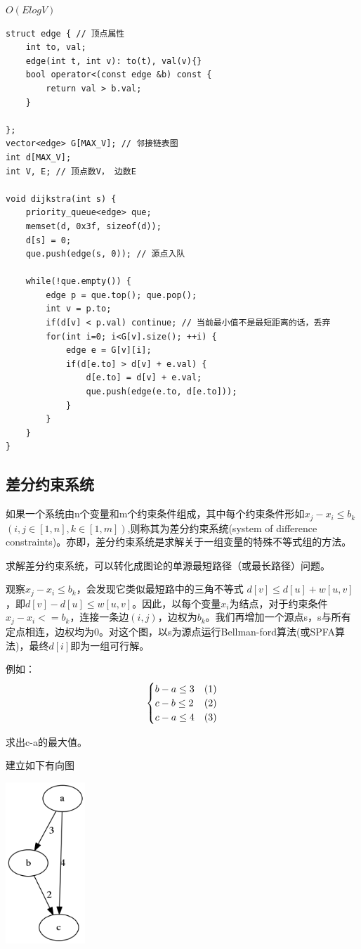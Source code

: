 \documentclass[a4paper]{ctexrep}
\begin{document}
$O(E logV)$
\begin{lstlisting}
struct edge { // 顶点属性
	int to, val;
	edge(int t, int v): to(t), val(v){}
	bool operator<(const edge &b) const {
		return val > b.val;
	}

};
vector<edge> G[MAX_V]; // 邻接链表图
int d[MAX_V];
int V, E; // 顶点数V， 边数E

void dijkstra(int s) {
	priority_queue<edge> que;
	memset(d, 0x3f, sizeof(d));
	d[s] = 0;
	que.push(edge(s, 0)); // 源点入队

	while(!que.empty()) {
		edge p = que.top(); que.pop();
		int v = p.to;
		if(d[v] < p.val) continue; // 当前最小值不是最短距离的话，丢弃
		for(int i=0; i<G[v].size(); ++i) {
			edge e = G[v][i];
			if(d[e.to] > d[v] + e.val) {
				d[e.to] = d[v] + e.val;
				que.push(edge(e.to, d[e.to]));
			}
		}
	}
}
\end{lstlisting}



\subsection{差分约束系统}
如果一个系统由n个变量和m个约束条件组成，其中每个约束条件形如$x_j-x_i \le b_k$ $(i,j \in [1,n],k \in [1,m])$,则称其为差分约束系统(system of difference constraints)。亦即，差分约束系统是求解关于一组变量的特殊不等式组的方法。

求解差分约束系统，可以转化成图论的单源最短路径（或最长路径）问题。

观察$x_j-x_i \le b_k$，会发现它类似最短路中的三角不等式 $d[v] \le d[u]+w[u,v]$，即$d[v]-d[u] \le w[u,v]$。因此，以每个变量$x_i$为结点，对于约束条件$x_j-x_i<=b_k$，连接一条边$(i,j)$，边权为$b_k$。我们再增加一个源点s，s与所有定点相连，边权均为0。对这个图，以s为源点运行Bellman-ford算法(或SPFA算法)，最终${d[i]}$即为一组可行解。

例如：
$$
\begin{cases}
   b-a \le 3  & (1)\cr
   c-b \le 2  & (2)\cr
   c-a \le 4 & (3)\cr
\end{cases}
$$

求出c-a的最大值。

建立如下有向图
\begin{center}
	\includegraphics[width=3cm] {sodc.png}
\end{center}
\end{document}
